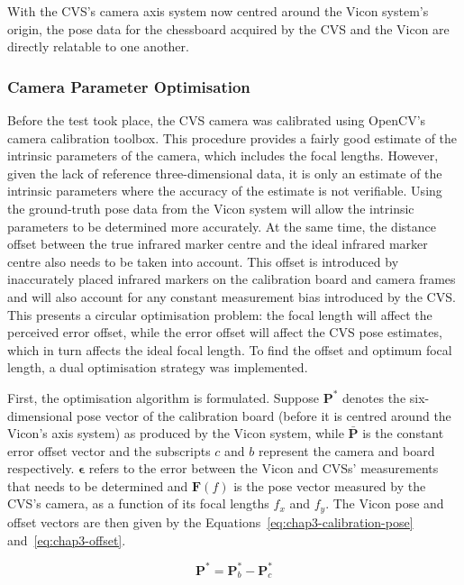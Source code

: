 With the CVS's camera axis system now centred around the Vicon system's origin, the pose data for the chessboard acquired by the CVS and the Vicon are directly relatable to one another.  

\subsubsection{Camera Parameter Optimisation}
\label{sec:focal-optimisation}

Before the test took place, the CVS camera was calibrated using OpenCV's camera calibration toolbox. This procedure provides a fairly good estimate of the intrinsic parameters of the camera, which includes the focal lengths. However, given the lack of reference three-dimensional data, it is only an estimate of the intrinsic parameters where the accuracy of the estimate is not verifiable. Using the ground-truth pose data from the Vicon system will allow the intrinsic parameters to be determined more accurately. At the same time, the distance offset between the true infrared marker centre and the ideal infrared marker centre also needs to be taken into account. This offset is introduced by inaccurately placed infrared markers on the calibration board and camera frames and will also account for any constant measurement bias introduced by the CVS\@. This presents a circular optimisation problem: the focal length will affect the perceived error offset, while the error offset will affect the CVS pose estimates, which in turn affects the ideal focal length. To find the offset and optimum focal length, a dual optimisation strategy was implemented.  

First, the optimisation algorithm is formulated. Suppose $\bm{P}^*$ denotes the six-dimensional pose vector of the calibration board (before it is centred around the Vicon's axis system) as produced by the Vicon system, while $\bar{\bm{P}}$ is the constant error offset vector and the subscripts $c$ and $b$ represent the camera and board respectively. $\bm{\epsilon}$ refers to the error between the Vicon and CVSs' measurements that needs to be determined and $\bm{F}(f)$ is the pose vector measured by the CVS's camera, as a function of its focal lengths $f_x$ and $f_y$. The Vicon pose and offset vectors are then given by the Equations~\ref{eq:chap3-calibration-pose} and~\ref{eq:chap3-offset}.

\begin{equation}
 \label{eq:chap3-calibration-pose}
  \bm{P}^* = \bm{P}^*_b - \bm{P}^*_c
\end{equation}


